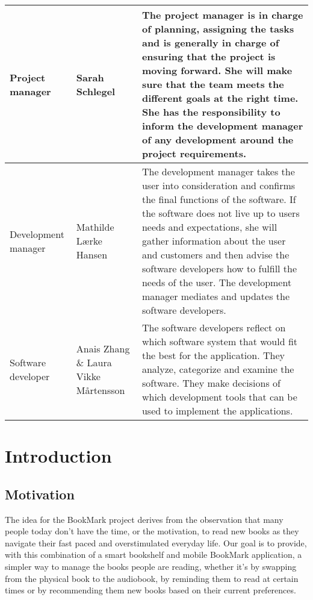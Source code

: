 \documentclass[conference]{IEEEtran}
\begin{document}
\begin{center}
\begin{tabular}{ | m{1.8cm} | m{1.5cm}| m{4.2cm} | } 

 \hline
 Project manager & Sarah Schlegel & The project manager is in charge of planning, assigning the tasks and is generally in charge of ensuring that the project is moving forward. She will make sure that the team meets the different goals at the right time. She has the responsibility to inform the development manager of any development around the project requirements. \\
  \hline
  Development manager &  Mathilde Lærke Hansen & The development manager takes the user into consideration and confirms the final functions of the software. If the software does not live up to users needs and expectations, she will gather information about the user and customers and then advise the software developers  how to fulfill the needs of the user. The development manager mediates and updates the software developers.\\
  \hline
 Software developer & Anais Zhang \&  Laura Vikke Mårtensson & The software developers reflect on which software system that would fit the best for the application. They analyze, categorize and examine the software. They make decisions of which development tools that can be used to implement the applications. \\ 
 \hline
\end{tabular}
\end{center}



\section{Introduction}

\subsection*{Motivation}
The idea for the BookMark project derives from the observation that many people today don't have the time, or the motivation, to read new books as they navigate their fast paced and overstimulated everyday life. Our goal is to provide, with this combination of a smart bookshelf and mobile BookMark application, a simpler way to manage the books people are reading, whether it's by swapping from the physical book to the audiobook, by reminding them to read at certain times or by recommending them new books based on their current preferences. \\ \\
\end{document}
